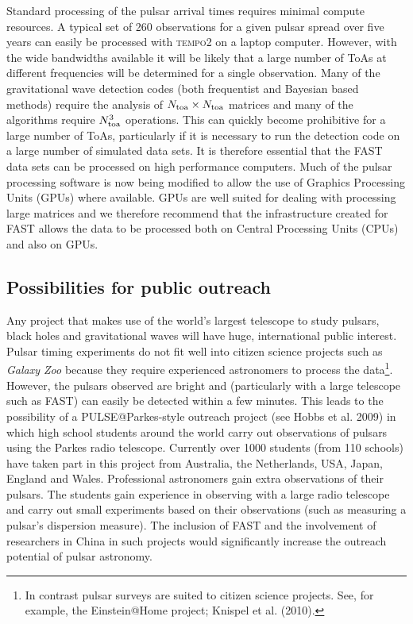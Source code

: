 \documentclass{raa}            %
\begin{document}
Standard processing of the pulsar arrival times requires minimal compute resources.  A typical set of 260 observations for a given pulsar spread over five years can easily be processed with \textsc{tempo2} on a laptop computer. However, with the wide bandwidths available it will be likely that a large number of ToAs at different frequencies will be determined for a single observation. Many of the gravitational wave detection codes (both frequentist and Bayesian based methods) require the analysis of $N_{\rm toa} \times N_{\rm toa}$ matrices and many of the algorithms require $N_{\rm toa}^3$ operations.  This can quickly become prohibitive for a large number of ToAs, particularly if it is necessary to run the detection code on a large number of simulated data sets.  It is therefore essential that the FAST data sets can be processed on high performance computers.  Much of the pulsar processing software is now being modified to allow the use of Graphics Processing Units (GPUs) where available.  GPUs are well suited for dealing with processing large matrices and we therefore recommend that the infrastructure created for FAST allows the data to be processed both on Central Processing Units (CPUs) and also on GPUs.





\subsection{Possibilities for public outreach}\label{sec:outreach}

Any project that makes use of the world's largest telescope to study pulsars, black holes and gravitational waves will have huge, international public interest.  Pulsar timing experiments do not fit well into citizen science projects such as \emph{Galaxy Zoo} because they require experienced astronomers to process the data\footnote{In contrast pulsar surveys are suited to citizen science projects. See, for example, the Einstein@Home project; Knispel et al. (2010)\nocite{kac+10}.}.  However, the pulsars observed are bright and (particularly with a large telescope such as FAST) can easily be detected within a few minutes.  This leads to the possibility of a PULSE@Parkes-style  outreach project (see Hobbs et al. 2009\nocite{hhc+09}) in which high school students around the world carry out observations of pulsars using the Parkes radio telescope.  Currently over 1000 students (from 110 schools) have taken part in this project from Australia, the Netherlands, USA, Japan, England and Wales.  Professional astronomers gain extra observations of their pulsars.  The students gain experience in observing with a large radio telescope and carry out small experiments based on their observations (such as measuring a pulsar's dispersion measure). The inclusion of FAST and the involvement of researchers in China in such projects would significantly increase the outreach potential of pulsar astronomy.
\end{document}

